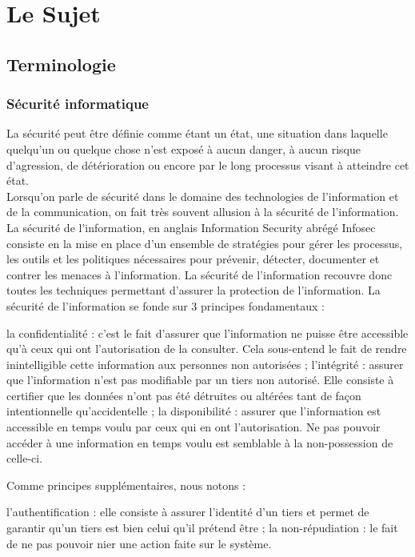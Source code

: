 \section{Le Sujet}


\subsection{Terminologie}

\subsubsection{Sécurité informatique}
La sécurité peut être définie comme étant un état, une situation dans laquelle quelqu’un ou quelque chose n’est exposé à aucun danger, à aucun risque d’agression, de détérioration ou encore par le long processus visant à atteindre cet état.\cite{cours-corenthin}\\
Lorsqu’on parle de sécurité dans le domaine des technologies de l’information et de la communication, on fait très souvent allusion à la sécurité de l’information. La sécurité de l'information, en anglais Information Security abrégé Infosec consiste en la mise en place d’un ensemble de stratégies pour gérer les processus, les outils et les politiques nécessaires pour prévenir, détecter, documenter et contrer les menaces à l'information. La sécurité de l’information recouvre donc toutes les techniques permettant d’assurer la protection de l’information.  La sécurité de l’information se fonde sur 3 principes fondamentaux : 
\begin{itemize}
	\itemcheck la confidentialité : c’est le fait d’assurer que l’information ne puisse être accessible qu’à ceux qui ont l’autorisation de la consulter. Cela sous-entend le fait de rendre inintelligible cette information aux personnes non autorisées ; 
	\itemcheck l’intégrité : assurer que l’information n’est pas modifiable par un tiers non autorisé. Elle consiste à certifier que les données n’ont pas été détruites ou altérées tant de façon intentionnelle qu’accidentelle ; 
	\itemcheck la disponibilité : assurer que l’information est accessible en temps voulu par ceux qui en ont l’autorisation. Ne pas pouvoir accéder à une information en temps voulu est semblable à la non-possession de celle-ci.
\end{itemize}
Comme principes supplémentaires, nous notons :
\begin{itemize}
	\itemcheck l’authentification : elle consiste à assurer l’identité d’un tiers et permet de garantir qu’un tiers est bien celui qu’il prétend être ;
	\itemcheck la non-répudiation : le fait de ne pas pouvoir nier une action faite sur le système.
\end{itemize}


